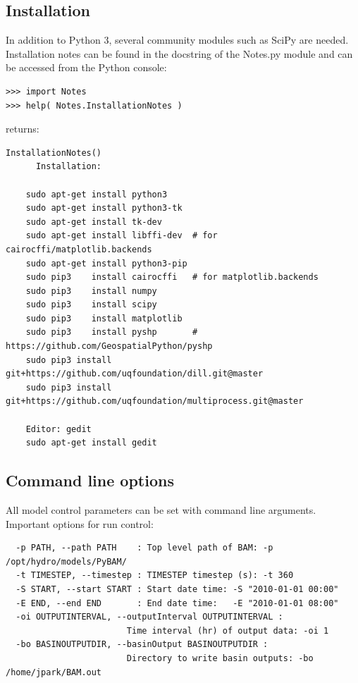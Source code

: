 \subsection{Installation}
\label{sec:Installation}
In addition to Python 3, several community modules such as SciPy are needed.  Installation notes can be found in the docstring of the Notes.py module and can be accessed from the Python console:
\small
\begin{verbatim}
>>> import Notes
>>> help( Notes.InstallationNotes )
\end{verbatim}
\large
returns:
\small
\begin{verbatim}
InstallationNotes()
      Installation:
    
    sudo apt-get install python3
    sudo apt-get install python3-tk
    sudo apt-get install tk-dev
    sudo apt-get install libffi-dev  # for cairocffi/matplotlib.backends
    sudo apt-get install python3-pip
    sudo pip3    install cairocffi   # for matplotlib.backends
    sudo pip3    install numpy
    sudo pip3    install scipy
    sudo pip3    install matplotlib
    sudo pip3    install pyshp       # https://github.com/GeospatialPython/pyshp
    sudo pip3 install git+https://github.com/uqfoundation/dill.git@master
    sudo pip3 install git+https://github.com/uqfoundation/multiprocess.git@master
    
    Editor: gedit 
    sudo apt-get install gedit
\end{verbatim}
\large

\subsection{Command line options}
\label{sec:Command line options}
All model control parameters can be set with command line arguments. Important options for run control:

\small
\begin{verbatim}
  -p PATH, --path PATH    : Top level path of BAM: -p /opt/hydro/models/PyBAM/
  -t TIMESTEP, --timestep : TIMESTEP timestep (s): -t 360
  -S START, --start START : Start date time: -S "2010-01-01 00:00"
  -E END, --end END       : End date time:   -E "2010-01-01 08:00"
  -oi OUTPUTINTERVAL, --outputInterval OUTPUTINTERVAL :
                        Time interval (hr) of output data: -oi 1
  -bo BASINOUTPUTDIR, --basinOutput BASINOUTPUTDIR :
                        Directory to write basin outputs: -bo /home/jpark/BAM.out
\end{verbatim}
\large

